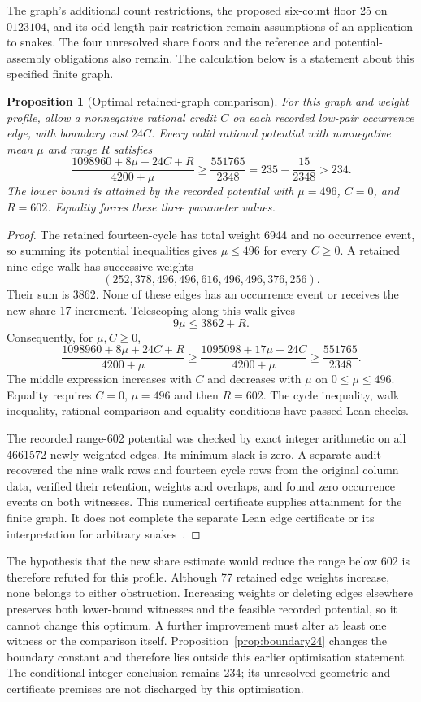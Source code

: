 \documentclass[11pt,a4paper]{article}
\newtheorem{proposition}[theorem]{Proposition}
\theoremstyle{definition}
\theoremstyle{remark}
\begin{document}
The graph's additional count restrictions, the proposed six-count floor
25 on $0123104$, and its odd-length pair restriction remain assumptions
of an application to snakes. The four unresolved share floors and the
reference and potential-assembly obligations also remain. The calculation
below is a statement about this specified finite graph.

\begin{proposition}[Optimal retained-graph comparison]\label{prop:range156-optimum}
For this graph and weight profile, allow a nonnegative rational credit $C$
on each recorded low-pair occurrence edge, with boundary cost $24C$.
Every valid rational potential with nonnegative mean $\mu$ and range $R$
satisfies
\[
\frac{1098960+8\mu+24C+R}{4200+\mu}
\ge\frac{551765}{2348}
=235-\frac{15}{2348}>234.
\]
The lower bound is attained by the recorded potential with
$\mu=496$, $C=0$, and $R=602$. Equality forces these three parameter values.
\end{proposition}
\begin{proof}
The retained fourteen-cycle has total weight 6944 and no occurrence event,
so summing its potential inequalities gives $\mu\le496$ for every $C\ge0$.
A retained nine-edge walk has successive weights
\[
(252,378,496,496,616,496,496,376,256).
\]
Their sum is 3862. None of these edges has an occurrence event or receives
the new share-17 increment. Telescoping along this walk gives
\[
9\mu\le3862+R.
\]
Consequently, for $\mu,C\ge0$,
\[
\frac{1098960+8\mu+24C+R}{4200+\mu}
\ge\frac{1095098+17\mu+24C}{4200+\mu}
\ge\frac{551765}{2348}.
\]
The middle expression increases with $C$ and decreases with
$\mu$ on $0\le\mu\le496$. Equality requires $C=0$, $\mu=496$ and then
$R=602$. The cycle inequality, walk inequality, rational comparison and
equality conditions have passed Lean checks.

The recorded range-602 potential was checked by exact integer arithmetic
on all 4661572 newly weighted edges. Its minimum slack is zero. A separate
audit recovered the nine walk rows and fourteen cycle rows from the
original column data, verified their retention, weights and overlaps,
and found zero occurrence events on both witnesses. This numerical
certificate supplies attainment for the finite graph. It does not
complete the separate Lean edge certificate or its interpretation for
arbitrary snakes~\cite{range156archive}.
\end{proof}

The hypothesis that the new share estimate would reduce the range below
602 is therefore refuted for this profile. Although 77 retained edge
weights increase, none belongs to either obstruction. Increasing weights
or deleting edges elsewhere preserves both lower-bound witnesses and
the feasible recorded potential, so it cannot change this optimum.
A further improvement must alter at least one witness or the comparison
itself. Proposition~\ref{prop:boundary24} changes the boundary constant and
therefore lies outside this earlier optimisation statement. The conditional integer conclusion remains 234; its unresolved
geometric and certificate premises are not discharged by this optimisation.
\end{document}
